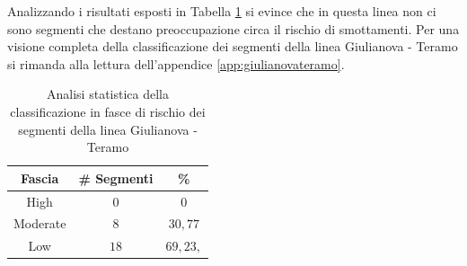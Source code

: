 \newline
Analizzando i risultati esposti in Tabella \ref{percentualegiulianovateramo} si evince che in questa linea non ci sono segmenti che destano preoccupazione circa il rischio di smottamenti. 
Per una visione completa della classificazione dei segmenti della linea Giulianova - Teramo si rimanda alla lettura dell'appendice \ref{app:giulianovateramo}.
\begin{table}[h]
\centering
\begin{tabular}{|c|c|c|}
\hline \rowcolor{lightgray}
Fascia   & \# Segmenti & \%    \\ \hline \rowcolor{flamingopink}
High     & $0$           & $0$     \\ \hline \rowcolor{icterine}
Moderate & $8$          & $30,77$ \\ \hline \rowcolor{inchworm}
Low      & $18$          & $69,23,$ \\ \hline
\end{tabular}
\caption{Analisi statistica della classificazione in fasce di rischio dei segmenti della linea Giulianova - Teramo}
\label{percentualegiulianovateramo}
\end{table}
 